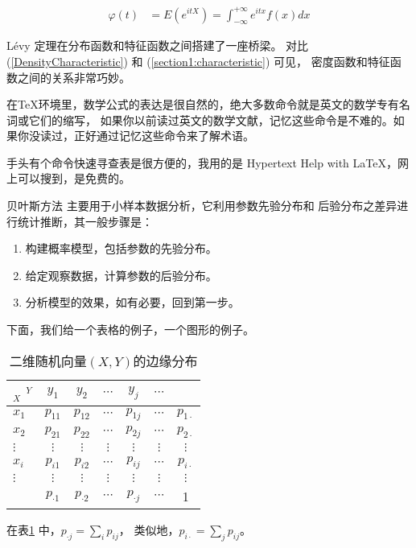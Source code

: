 \documentclass[12pt,a4paper]{article}
\def\attention{\lettrine[lines=2,lraise=0,nindent=0em]{\large\textdbend\hspace{1mm}}{}}
\begin{document}
\begin{align}
 \label{section1:characteristic}   %
 \varphi(t)&= E(e^{itX})=\int^{+\infty}_{-\infty} e^{itx} f(x)dx
\end{align}

L\'{e}vy 定理在分布函数和特征函数之间搭建了一座桥梁。
对比 (\ref{DensityCharacteristic}) 和 (\ref{section1:characteristic}) 可见，
密度函数和特征函数之间的关系非常巧妙。

                                                                                                                 
\attention 在\TeX 环境里，数学公式的表达是很自然的，绝大多数命令就是英文的数学专有名词或它们的缩写，
如果你以前读过英文的数学文献，记忆这些命令是不难的。如果你没读过，正好通过记忆这些命令来了解术语。


手头有个命令快速寻查表是很方便的，我用的是 Hypertext Help with \LaTeX，网上可以搜到，是免费的。

贝叶斯方法\cite{Gelman} 主要用于小样本数据分析，它利用参数先验分布和
后验分布之差异进行统计推断，其一般步骤是：

\begin{enumerate}
 \item 构建概率模型，包括参数的先验分布。
 \item 给定观察数据，计算参数的后验分布。
 \item 分析模型的效果，如有必要，回到第一步。
\end{enumerate}

\begin{example}
下面，我们给一个表格的例子，一个图形的例子。

\begin{center}
\begin{table}[!ht]     %
\centering
\caption{二维随机向量$(X,Y)$的边缘分布}
\begin{tabular}{l|ccccc|c}
  $_X$\hspace{3mm} $^Y$&$y_1$&$y_2$&$\cdots$&$y_j$&$\cdots$\\
\hline
$x_1$   &$p_{11}$&$p_{12}$&$\cdots$&$p_{1j}$&$\cdots$&$p_{1\cdot}$\\
$x_2$   &$p_{21}$&$p_{22}$&$\cdots$&$p_{2j}$&$\cdots$&$p_{2\cdot}$\\
$\vdots$&$\vdots$&$\vdots$&$\vdots$&$\vdots$&$\vdots$&$\vdots$\\
$x_i$   &$p_{i1}$&$p_{i2}$&$\cdots$&$p_{ij}$&$\cdots$&$p_{i\cdot}$\\
$\vdots$&$\vdots$&$\vdots$&$\vdots$&$\vdots$&$\vdots$&$\vdots$\\
\hline
   &$p_{\cdot 1}$&$p_{\cdot 2}$&$\cdots$&$p_{\cdot j}$&$\cdots$&1
\label{marginal distribution}
\end{tabular}
\end{table}
\end{center}

在表\ref{marginal distribution} 中，$p_{\cdot j}=\sum\limits_i p_{ij}$，
类似地，$ p_{i\cdot}=\sum\limits_j p_{ij}$。
\end{example}
\end{document}
